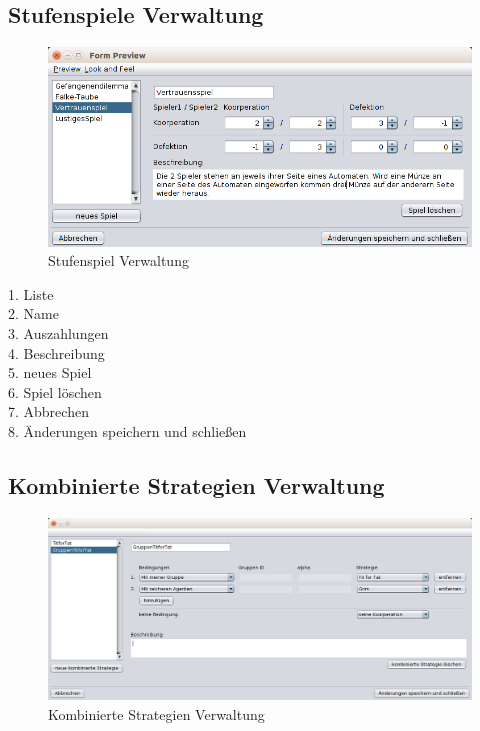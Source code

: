 \subsection{Stufenspiele Verwaltung}

\begin{figure}[hp] 
  \centering
     \includegraphics[width=1.1\textwidth]{GUI_Entwurf/SpieleMenue.png}
  \caption{Stufenspiel Verwaltung}
  \label{fig:Bild1}
\end{figure}

\begin{description}

\item[1. Liste] 

\item[2. Name] 

\item[3. Auszahlungen] 

\item[4. Beschreibung] 

\item[5. neues Spiel] 

\item[6. Spiel löschen] 

\item[7. Abbrechen] 

\item[8. Änderungen speichern und schließen] 

\end{description}

\pagebreak

\subsection{Kombinierte Strategien Verwaltung}

\begin{figure}[hp] 
  \centering
     \includegraphics[width=1.1\textwidth]{GUI_Entwurf/StrategienMenue.png}
  \caption{Kombinierte Strategien Verwaltung}
  \label{fig:Bild1}
\end{figure}

